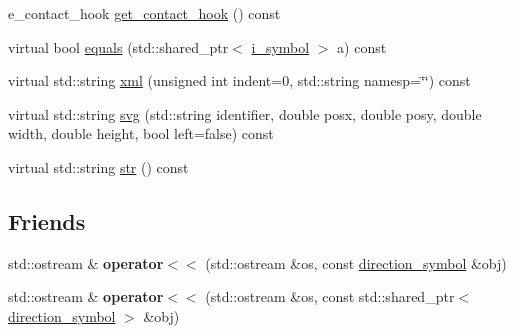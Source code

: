 \begin{DoxyCompactItemize}
\item 
e\-\_\-contact\-\_\-hook \hyperlink{classmae_1_1fl_1_1laban_1_1mv_1_1direction__symbol_aa19b098d88f1d052436b2c4be877d38a}{get\-\_\-contact\-\_\-hook} () const 
\item 
virtual bool \hyperlink{classmae_1_1fl_1_1laban_1_1mv_1_1direction__symbol_a2ea85fd4be221d8dc2da7ee417dd829c}{equals} (std\-::shared\-\_\-ptr$<$ \hyperlink{classmae_1_1fl_1_1laban_1_1mv_1_1i__symbol}{i\-\_\-symbol} $>$ a) const 
\item 
virtual std\-::string \hyperlink{classmae_1_1fl_1_1laban_1_1mv_1_1direction__symbol_a987e147f6a6ae37e50d450f382d850c1}{xml} (unsigned int indent=0, std\-::string namesp=\char`\"{}\char`\"{}) const 
\item 
virtual std\-::string \hyperlink{classmae_1_1fl_1_1laban_1_1mv_1_1direction__symbol_af0e41f900f48beafee3e8daeade9687e}{svg} (std\-::string identifier, double posx, double posy, double width, double height, bool left=false) const 
\item 
virtual std\-::string \hyperlink{classmae_1_1fl_1_1laban_1_1mv_1_1direction__symbol_a3d6beaca72898fa289efd8dfc7e283f7}{str} () const 
\end{DoxyCompactItemize}
\subsection*{Friends}
\begin{DoxyCompactItemize}
\item 
\hypertarget{classmae_1_1fl_1_1laban_1_1mv_1_1direction__symbol_a16a89647391c8b8ffee475f535b8380b}{std\-::ostream \& {\bfseries operator$<$$<$} (std\-::ostream \&os, const \hyperlink{classmae_1_1fl_1_1laban_1_1mv_1_1direction__symbol}{direction\-\_\-symbol} \&obj)}\label{classmae_1_1fl_1_1laban_1_1mv_1_1direction__symbol_a16a89647391c8b8ffee475f535b8380b}

\item 
\hypertarget{classmae_1_1fl_1_1laban_1_1mv_1_1direction__symbol_a7777346ab8e477f0dbb9706babefe05c}{std\-::ostream \& {\bfseries operator$<$$<$} (std\-::ostream \&os, const std\-::shared\-\_\-ptr$<$ \hyperlink{classmae_1_1fl_1_1laban_1_1mv_1_1direction__symbol}{direction\-\_\-symbol} $>$ \&obj)}\label{classmae_1_1fl_1_1laban_1_1mv_1_1direction__symbol_a7777346ab8e477f0dbb9706babefe05c}

\end{DoxyCompactItemize}


